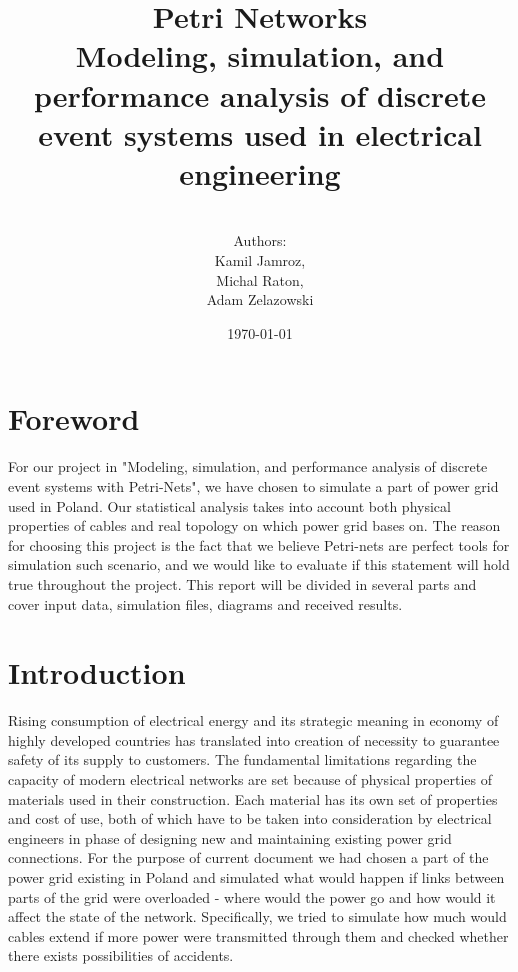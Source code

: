 \documentclass[a4paper]{article}
\title{Petri Networks\\Modeling, simulation, and performance analysis of discrete event systems used in electrical engineering}
\author{\\Authors:\\ Kamil Jamroz,\\ Michal Raton,\\ Adam Zelazowski\\}
\date{\today}
\begin{document}
\nocite{*}

\maketitle

\clearpage

\tableofcontents

\clearpage

%
\section{Foreword}
\label{cha:foreword}

For our project in "Modeling, simulation, and performance analysis of discrete event systems with Petri-Nets", we have chosen to simulate a part of power grid used in Poland. Our statistical analysis takes into account both physical properties of cables and real topology on which power grid bases on. The reason for choosing this project is the fact that we believe Petri-nets are perfect tools for simulation such scenario, and we would like to evaluate if this statement will hold true throughout the project. This report will be divided in several parts and cover input data, simulation files, diagrams and received results.

%
\section{Introduction}  
\label{cha:introduction}

Rising consumption of electrical energy and its strategic meaning in economy of highly developed countries has translated into creation of necessity to guarantee safety of its supply to customers. The fundamental limitations regarding the capacity of modern electrical networks are set because of physical properties of materials used in their construction. Each material has its own set of properties and cost of use, both of which have to be taken into consideration by electrical engineers in phase of designing new and maintaining existing power grid connections. For the purpose of current document we had chosen a part of the power grid existing in Poland and simulated what would happen if links between parts of the grid were overloaded - where would the power go and how would it affect the state of the network. Specifically, we tried to simulate how much would cables extend if more power were transmitted through them and checked whether there exists possibilities of accidents.
\end{document}
